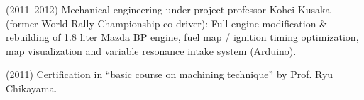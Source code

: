 \documentclass[letterpaper,11pt]{article}
\begin{document}
(2011--2012) Mechanical engineering under project professor Kohei Kusaka (former World Rally
 Championship co-driver):
 Full engine modification \& rebuilding of 1.8 liter Mazda BP engine,
 fuel map / ignition timing optimization, map visualization and
 variable resonance intake system (Arduino).

(2011) Certification in ``basic course on machining technique'' by Prof. Ryu Chikayama.



%
%
%
\end{document}
